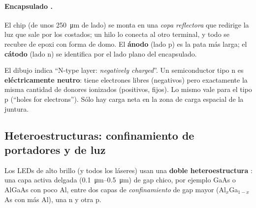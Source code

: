 \paragraph{Encapsulado .} El chip (de unos \SI{250}{\micro m} de lado) se
monta en una \emph{copa reflectora} que redirige la luz que sale por los costados; un hilo
lo conecta al otro terminal, y todo se recubre de epoxi con forma de domo. El
\textbf{ánodo} (lado p) es la pata más larga; el \textbf{cátodo} (lado n) se identifica por
el lado plano del encapsulado.

\begin{ojo}[\diapo{24}]
El dibujo indica ``N-type layer: \emph{negatively charged}''. Un semiconductor tipo n es
\textbf{eléctricamente neutro}: tiene electrones libres (negativos) pero exactamente la misma
cantidad de donores ionizados (positivos, fijos). Lo mismo vale para el tipo p (``holes for
electrons''). Sólo hay carga neta en la zona de carga espacial de la juntura.
\end{ojo}

\subsection{Heteroestructuras: confinamiento de portadores y de luz}

Los LEDs de alto brillo (y todos los láseres) usan una \textbf{doble heteroestructura}
: una capa activa delgada (\SIrange{0.1}{0.5}{\micro m}) de gap chico, por
ejemplo GaAs o AlGaAs con poco Al, entre dos capas de \emph{confinamiento} de gap mayor
(Al$_x$Ga$_{1-x}$As con más Al), una n y otra p.

